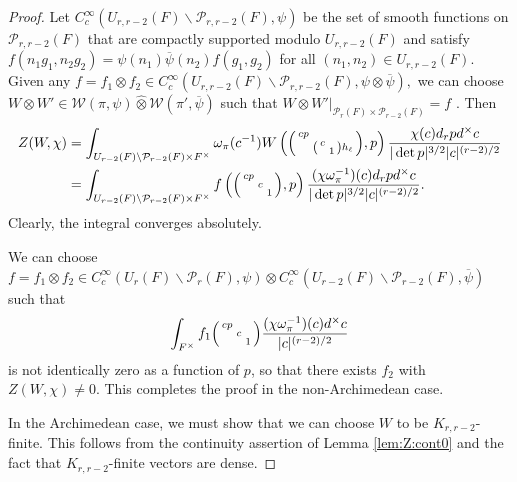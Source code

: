 \documentclass[12pt]{amsart}
\theoremstyle{remark}
\numberwithin{equation}{section}
\theoremstyle{definition}
\newenvironment{psmatrix}
  {\left(\begin{smallmatrix}}
  {\end{smallmatrix}\right)}
\numberwithin{equation}{subsection}
\begin{document}
\begin{proof}
Let
$C_c^\infty(U_{r,r-2}(F) \backslash \mathcal{P}_{r,r-2}(F),\psi)$ be the set of smooth functions on $\mathcal{P}_{r,r-2}(F)$ that are compactly supported modulo $U_{r,r-2}(F)$ and satisfy $f(n_1g_1,n_2g_2)=\psi(n_1)\overline{\psi}(n_2)f(g_1,g_2)$ for all $(n_1,n_2) \in U_{r,r-2}(F).$  Given any $f=f_1\otimes f_2\in C_c^\infty(U_{r,r-2}(F) \backslash \mathcal{P}_{r,r-2}(F),\psi \otimes \overline{\psi}),$ we can choose $W \otimes W' \in \mathcal{W}(\pi,\psi) \widehat{\otimes} \mathcal{W}(\pi',\overline{\psi})$ such that $W \otimes W'|_{\mathcal{P}_{r}(F) \times \mathcal{P}_{r-2}(F)}=f$ \cite[(2.2)]{JPSS:Conv} \cite[Theorem 1]{Kemarsky} \cite[Proposition 5]{Jacquet:quasi-split}. Then
\begin{align*}
    Z(W,\chi)&=\int_{U_{r-2}(F) \backslash \mathcal{P}_{r-2}(F) \times F^\times} \omega_\pi(c^{-1})W\left(\begin{psmatrix}cp & \\ & \begin{psmatrix} c& \\
&  1\end{psmatrix}h_\ell \end{psmatrix},p  \right)\frac{\chi(c)d_r pd^\times c}{|\det p|^{3/2}|c|^{(r-2)/2}}\\
&=\int_{U_{r-2}(F) \backslash \mathcal{P}_{r-2}(F) \times F^\times} f\left(\begin{psmatrix}cp & &\\ & c& \\
& & 1\end{psmatrix},p  \right)\frac{(\chi\omega_\pi^{-1})(c)d_r pd^\times c}{|\det p|^{3/2}|c|^{(r-2)/2}}.
\end{align*}
Clearly, the integral converges absolutely. 

We can choose $f=f_1\otimes f_2 \in C_c^\infty(U_r(F) \backslash \mathcal{P}_{r}(F),\psi) \otimes  C_c^\infty(U_{r-2}(F) \backslash \mathcal{P}_{r-2}(F),\overline{\psi})$ such that
\begin{align*}
    \int_{F^\times} f_1\begin{psmatrix}cp & &\\ & c& \\
& & 1\end{psmatrix}\frac{(\chi\omega_\pi^{-1})(c)d^\times c}{|c|^{(r-2)/2}} 
\end{align*}
is not identically zero as a function of $p$, so that there exists $f_2$ with $Z(W,\chi)\neq 0.$  This completes the proof in the non-Archimedean case.  

In the Archimedean case, we must show that we can choose $W$ to be $K_{r,r-2}$-finite.  This follows from the continuity assertion of Lemma \ref{lem:Z:cont0} and the fact that $K_{r,r-2}$-finite vectors are dense.
\end{proof}
\end{document}

